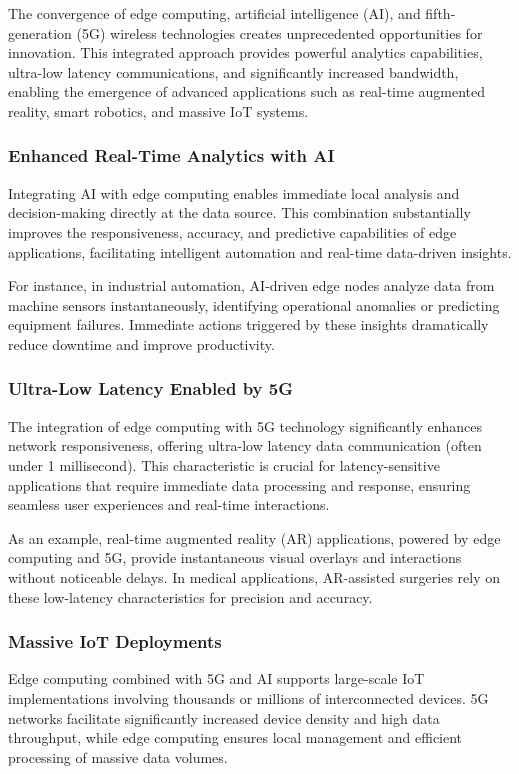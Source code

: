 \documentclass[runningheads]{llncs}
\begin{document}
The convergence of edge computing, artificial intelligence (AI), and fifth-generation (5G) wireless technologies creates unprecedented opportunities for innovation. This integrated approach provides powerful analytics capabilities, ultra-low latency communications, and significantly increased bandwidth, enabling the emergence of advanced applications such as real-time augmented reality, smart robotics, and massive IoT systems.

\subsubsection{Enhanced Real-Time Analytics with AI}
Integrating AI with edge computing enables immediate local analysis and decision-making directly at the data source. This combination substantially improves the responsiveness, accuracy, and predictive capabilities of edge applications, facilitating intelligent automation and real-time data-driven insights.

\noindent For instance, in industrial automation, AI-driven edge nodes analyze data from machine sensors instantaneously, identifying operational anomalies or predicting equipment failures. Immediate actions triggered by these insights dramatically reduce downtime and improve productivity.

\subsubsection{Ultra-Low Latency Enabled by 5G}
The integration of edge computing with 5G technology significantly enhances network responsiveness, offering ultra-low latency data communication (often under 1 millisecond). This characteristic is crucial for latency-sensitive applications that require immediate data processing and response, ensuring seamless user experiences and real-time interactions.

\noindent As an example, real-time augmented reality (AR) applications, powered by edge computing and 5G, provide instantaneous visual overlays and interactions without noticeable delays. In medical applications, AR-assisted surgeries rely on these low-latency characteristics for precision and accuracy.

\subsubsection{Massive IoT Deployments}
Edge computing combined with 5G and AI supports large-scale IoT implementations involving thousands or millions of interconnected devices. 5G networks facilitate significantly increased device density and high data throughput, while edge computing ensures local management and efficient processing of massive data volumes.
\end{document}
